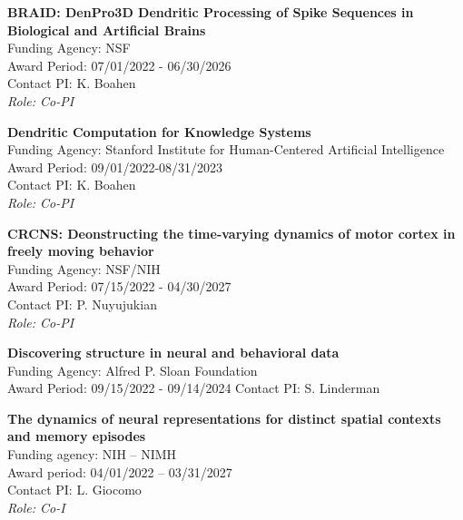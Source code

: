 \documentclass[10pt]{article}
\begin{document}
\begin{outerlist}
\item \textbf{BRAID: DenPro3D Dendritic Processing of Spike Sequences in Biological and Artificial Brains} \\
  Funding Agency: NSF \\
  Award Period: 07/01/2022 - 06/30/2026\\
  Contact PI: K. Boahen\\
  \textit{Role: Co-PI}
  
\item \textbf{Dendritic Computation for Knowledge Systems} \\
  Funding Agency: Stanford Institute for Human-Centered Artificial Intelligence \\
  Award Period: 09/01/2022-08/31/2023\\
  Contact PI: K. Boahen \\
  \textit{Role: Co-PI}
  
\item \textbf{CRCNS: Deonstructing the time-varying dynamics of motor cortex in freely moving behavior} \\
  Funding Agency: NSF/NIH \\
  Award Period: 07/15/2022 - 04/30/2027 \\
  Contact  PI: P. Nuyujukian \\
  \textit{Role: Co-PI}
  
\item \textbf{Discovering structure in neural and behavioral data} \\
  Funding Agency: Alfred P. Sloan Foundation \\
  Award Period: 09/15/2022 - 09/14/2024
  Contact PI: S. Linderman
  
  
\item \textbf{The dynamics of neural representations for distinct spatial contexts and memory episodes} \\
  Funding agency: NIH – NIMH \\
  Award period: 04/01/2022 – 03/31/2027 \\
  Contact PI: L. Giocomo  \\
  \textit{Role: Co-I}


\end{outerlist}
\end{document}
